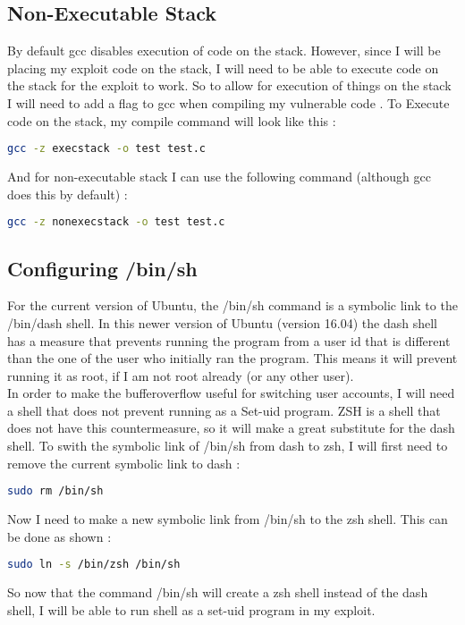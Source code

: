 \documentclass[14pt]{extarticle}
\begin{document}
\subsection{Non-Executable Stack}
By default gcc disables execution of code on the stack. However, since I will be placing my exploit code on the stack, I will need to be able to execute code on the stack for the exploit to work. So to allow for execution of things on the stack I will need to add a flag to gcc when compiling my vulnerable code \cite{seed-bof}.
To Execute code on the stack, my compile command will look like this \cite{seed-bof}:
\begin{lstlisting}[language=bash]
   gcc -z execstack -o test test.c
\end{lstlisting}
And for non-executable stack I can use the following command (although gcc does this by default) \cite{seed-bof}:
\begin{lstlisting}[language=bash]
   gcc -z nonexecstack -o test test.c
\end{lstlisting}

\subsection{Configuring /bin/sh}
For the current version of Ubuntu, the /bin/sh command is a symbolic link to the /bin/dash shell. In this newer version of Ubuntu (version 16.04) the dash shell has a measure that prevents running the program from a user id that is different than the one of the user who initially ran the program. This means it will prevent running it as root, if I am not root already (or any other user). \\
In order to make the bufferoverflow useful for switching user accounts, I will need a shell that does not prevent running as a Set-uid program. ZSH is a shell that does not have this countermeasure, so it will make a great substitute for the dash shell. To swith the symbolic link of /bin/sh from dash to zsh, I will first need to remove the current symbolic link to dash \cite{seed-bof}:
\begin{lstlisting}[language=bash]
  sudo rm /bin/sh
\end{lstlisting}
Now I need to make a new symbolic link from /bin/sh to the zsh shell. This can be done as shown \cite{seed-bof}:
\begin{lstlisting}[language=bash]
  sudo ln -s /bin/zsh /bin/sh
\end{lstlisting}
So now that the command /bin/sh will create a zsh shell instead of the dash shell, I will be able to run shell as a set-uid program in my exploit.
\end{document}
